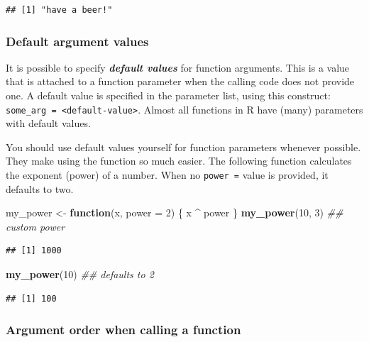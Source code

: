 \documentclass[]{book}
\newenvironment{Shaded}{\begin{snugshade}}{\end{snugshade}}
\newcommand{\CommentTok}[1]{\textcolor[rgb]{0.56,0.35,0.01}{\textit{#1}}}
\newcommand{\ControlFlowTok}[1]{\textcolor[rgb]{0.13,0.29,0.53}{\textbf{#1}}}
\newcommand{\DataTypeTok}[1]{\textcolor[rgb]{0.13,0.29,0.53}{#1}}
\newcommand{\DecValTok}[1]{\textcolor[rgb]{0.00,0.00,0.81}{#1}}
\newcommand{\KeywordTok}[1]{\textcolor[rgb]{0.13,0.29,0.53}{\textbf{#1}}}
\newcommand{\NormalTok}[1]{#1}
\newcommand{\OperatorTok}[1]{\textcolor[rgb]{0.81,0.36,0.00}{\textbf{#1}}}
\newcommand{\StringTok}[1]{\textcolor[rgb]{0.31,0.60,0.02}{#1}}
\begin{document}
\begin{verbatim}
## [1] "have a beer!"
\end{verbatim}

\hypertarget{default-argument-values}{%
\subsubsection*{Default argument values}\label{default-argument-values}}

It is possible to specify \textbf{\emph{default values}} for function arguments. This is a value that is attached to a function parameter when the calling code does not provide one. A default value is specified in the parameter list, using this construct: \texttt{some\_arg\ =\ \textless{}default-value\textgreater{}}. Almost all functions in R have (many) parameters with default values.

You should use default values yourself for function parameters whenever possible. They make using the function so much easier. The following function calculates the exponent (power) of a number. When no \texttt{power\ =} value is provided, it defaults to two.

\begin{Shaded}
\begin{Highlighting}[]
\NormalTok{my_power <-}\StringTok{ }\ControlFlowTok{function}\NormalTok{(x, }\DataTypeTok{power =} \DecValTok{2}\NormalTok{) \{}
\NormalTok{    x }\OperatorTok{^}\StringTok{ }\NormalTok{power}
\NormalTok{\}}
\KeywordTok{my_power}\NormalTok{(}\DecValTok{10}\NormalTok{, }\DecValTok{3}\NormalTok{) }\CommentTok{## custom power}
\end{Highlighting}
\end{Shaded}

\begin{verbatim}
## [1] 1000
\end{verbatim}

\begin{Shaded}
\begin{Highlighting}[]
\KeywordTok{my_power}\NormalTok{(}\DecValTok{10}\NormalTok{) }\CommentTok{## defaults to 2}
\end{Highlighting}
\end{Shaded}

\begin{verbatim}
## [1] 100
\end{verbatim}

\hypertarget{argument-order-when-calling-a-function}{%
\subsubsection*{Argument order when calling a function}\label{argument-order-when-calling-a-function}}
\end{document}
